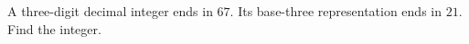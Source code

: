 A three-digit decimal integer ends in $67$. Its base-three representation ends in $21$. Find the integer.

